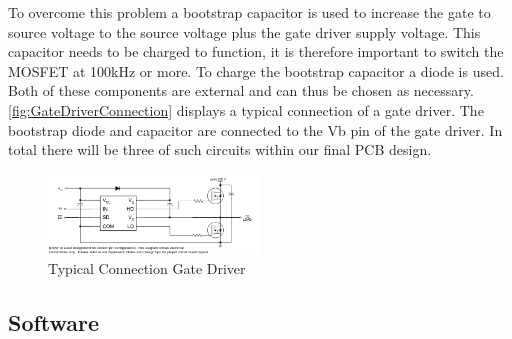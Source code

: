 To overcome this problem a bootstrap capacitor is used to increase the gate to source voltage to the source voltage plus the gate driver supply voltage. This capacitor needs to be charged to function, it is therefore important to switch the MOSFET at 100kHz or more. To charge the bootstrap capacitor a diode is used. Both of these components are external and can thus be chosen as necessary. \autoref{fig:GateDriverConnection} displays a typical connection of a gate driver. The bootstrap diode and capacitor are connected to the Vb pin of the gate driver. In total there will be three of such circuits within our final PCB design.

\begin{figure}[H]
    \centering
    \includegraphics[width=0.5\textwidth]{img/GateDriver/Typical Connection Gate Driver.png}
    \caption{Typical Connection Gate Driver}
    \label{fig:GateDriverConnection}
\end{figure}

\subsection{Software}






    

